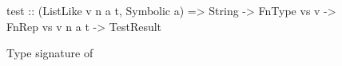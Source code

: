 \begin{figure}
    \begin{smallhskcode}
test :: (ListLike v n a t, Symbolic a) => String -> FnType vs v -> FnRep vs v n a t -> TestResult
    \end{smallhskcode}
    \caption{Type signature of }
    \label{fig:test2-eq}
\end{figure}